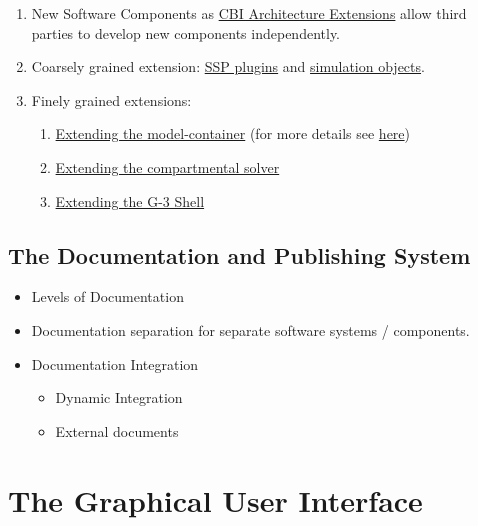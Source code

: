 \documentclass[12pt]{article}
\begin{document}
\begin{enumerate}
\item New Software Components as
  \href{../genesis-addto-component-developerpackage/genesis-addto-component-developerpackage.tex}{CBI
    Architecture Extensions} allow third parties to develop new
  components independently.
\item Coarsely grained extension:
  \href{../genesis-add-feature-ssp/genesis-add-feature-ssp.tex}{SSP
    plugins} and
  \href{../genesis-add-object-solver/genesis-add-object-solver.tex}{simulation
    objects}.
\item Finely grained extensions:
  \begin{enumerate}
  \item
    \href{../genesis-extend-model-container/genesis-extend-model-container.tex}{Extending
      the model-container} (for more details see
    \href{../genesis-extend-model-container-detail/genesis-extend-model-container-detail.tex}{here})
  \item
    \href{../genesis-add-object-solver/genesis-add-object-solver.tex}{Extending the compartmental solver}
  \item \href{../genesis-add-object-solver/genesis-add-object-solver.tex}{Extending the G-3 Shell}
  \end{enumerate}
\end{enumerate}



\subsection{The Documentation and Publishing System}

\begin{itemize}
\item Levels of Documentation
\item Documentation separation for separate software systems /
  components.
\item Documentation Integration
  \begin{itemize}
  \item Dynamic Integration
  \item External documents %
  \end{itemize}
\end{itemize}


\section{The Graphical User Interface}
\end{document}
